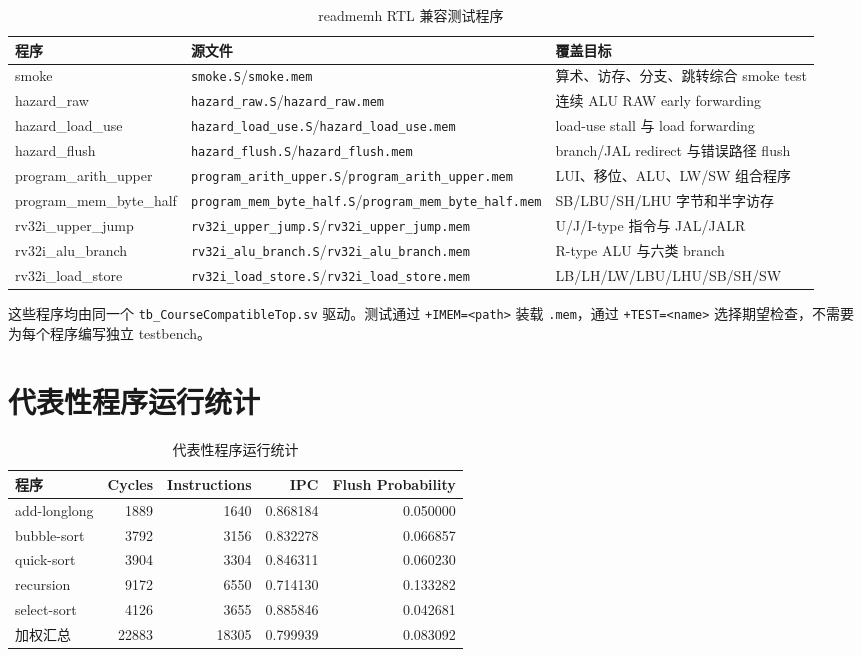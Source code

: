 \documentclass[UTF8,a4paper,12pt]{ctexrep}
\begin{document}
\begin{table}[htbp]
  \centering
  \caption{readmemh RTL 兼容测试程序}
  \begin{tabularx}{\textwidth}{lXX}
    \toprule
    程序 & 源文件 & 覆盖目标 \\
    \midrule
    smoke & \texttt{smoke.S}/\texttt{smoke.mem} & 算术、访存、分支、跳转综合 smoke test \\
    hazard\_raw & \texttt{hazard\_raw.S}/\texttt{hazard\_raw.mem} & 连续 ALU RAW early forwarding \\
    hazard\_load\_use & \texttt{hazard\_load\_use.S}/\texttt{hazard\_load\_use.mem} & load-use stall 与 load forwarding \\
    hazard\_flush & \texttt{hazard\_flush.S}/\texttt{hazard\_flush.mem} & branch/JAL redirect 与错误路径 flush \\
    program\_arith\_upper & \texttt{program\_arith\_upper.S}/\texttt{program\_arith\_upper.mem} & LUI、移位、ALU、LW/SW 组合程序 \\
    program\_mem\_byte\_half & \texttt{program\_mem\_byte\_half.S}/\texttt{program\_mem\_byte\_half.mem} & SB/LBU/SH/LHU 字节和半字访存 \\
    rv32i\_upper\_jump & \texttt{rv32i\_upper\_jump.S}/\texttt{rv32i\_upper\_jump.mem} & U/J/I-type 指令与 JAL/JALR \\
    rv32i\_alu\_branch & \texttt{rv32i\_alu\_branch.S}/\texttt{rv32i\_alu\_branch.mem} & R-type ALU 与六类 branch \\
    rv32i\_load\_store & \texttt{rv32i\_load\_store.S}/\texttt{rv32i\_load\_store.mem} & LB/LH/LW/LBU/LHU/SB/SH/SW \\
    \bottomrule
  \end{tabularx}
\end{table}

这些程序均由同一个 \texttt{tb\_CourseCompatibleTop.sv} 驱动。测试通过 \texttt{+IMEM=<path>} 装载 \texttt{.mem}，通过 \texttt{+TEST=<name>} 选择期望检查，不需要为每个程序编写独立 testbench。

\chapter{代表性程序运行统计}

\begin{table}[htbp]
  \centering
  \caption{代表性程序运行统计}
  \begin{tabular}{lrrrr}
    \toprule
    程序 & Cycles & Instructions & IPC & Flush Probability \\
    \midrule
    add-longlong & 1889 & 1640 & 0.868184 & 0.050000 \\
    bubble-sort & 3792 & 3156 & 0.832278 & 0.066857 \\
    quick-sort & 3904 & 3304 & 0.846311 & 0.060230 \\
    recursion & 9172 & 6550 & 0.714130 & 0.133282 \\
    select-sort & 4126 & 3655 & 0.885846 & 0.042681 \\
    \midrule
    加权汇总 & 22883 & 18305 & 0.799939 & 0.083092 \\
    \bottomrule
  \end{tabular}
\end{table}
\end{document}

